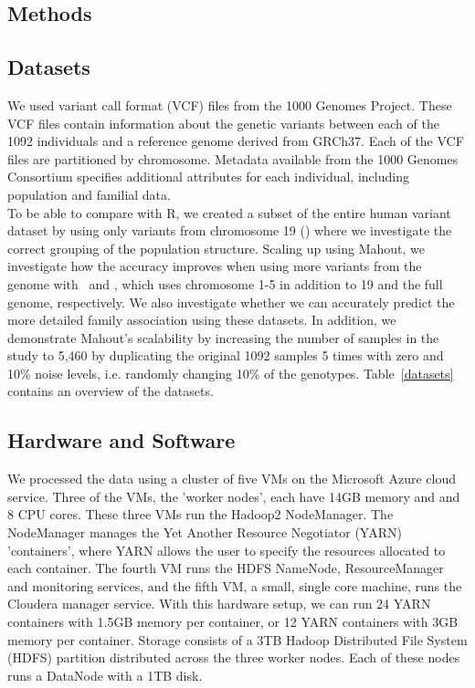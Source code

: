 \documentclass{bioinfo}
\begin{document}
\begin{methods}
\section{Methods}
\subsection*{Datasets}
We used variant call format (VCF) files from the 1000 Genomes Project.
These VCF files contain information about the genetic variants between each of the 1092 individuals and a reference genome derived from GRCh37. 
Each of the VCF files are partitioned by chromosome.
Metadata available from the 1000 Genomes Consortium specifies additional attributes for each individual, including population and familial data.\\
To be able to compare with R, we created a subset of the entire human variant dataset by using only variants from chromosome 19 (\NinteenPhaseone ) where we investigate the correct grouping of the population structure. 
Scaling up using Mahout, we investigate how the accuracy improves when using more variants from the genome with \SevenPhaseone\ and \FullPhasethree, which uses chromosome 1-5 in addition to 19 and the full genome, respectively. 
We also investigate whether we can accurately predict the more detailed family association using these datasets. 
In addition, we demonstrate Mahout's scalability by increasing the number of samples in the study to 5,460 by duplicating the original 1092 samples 5 times with zero and 10\% noise levels, i.e. randomly changing 10\% of the genotypes. 
Table~\ref{datasets} contains an overview of the datasets.

\subsection*{Hardware and Software}
We processed the data using a cluster of five VMs on the Microsoft Azure cloud service. Three of the VMs, the 'worker nodes', each have 14GB memory and and 8 CPU cores. These three VMs run the Hadoop2 NodeManager. The NodeManager manages the Yet Another Resource Negotiator (YARN) 'containers', where YARN allows the user
to specify the resources allocated to each container.
The fourth VM runs the HDFS NameNode, ResourceManager and monitoring services, and the fifth VM, a small, single core machine, runs the Cloudera manager service.
With this hardware setup, we can run 24 YARN containers with 1.5GB memory per container, or 12 YARN containers with 3GB memory per container.
Storage consists of a 3TB Hadoop Distributed File System (HDFS) partition distributed across the three worker nodes. Each of these nodes runs a DataNode with a 1TB disk.


\end{methods}
\end{document}
